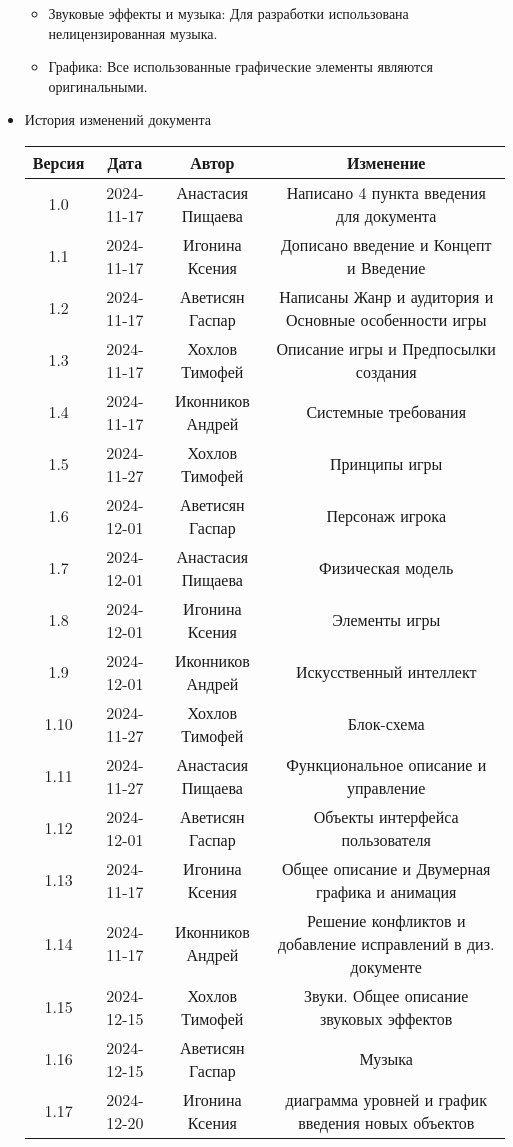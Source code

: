 \documentclass{article}
\begin{document}
\begin{itemize}
\begin{itemize}
\item Звуковые эффекты и музыка: Для разработки использована нелицензированная музыка.

\item Графика: Все использованные графические элементы являются оригинальными.
\end{itemize}

\item История изменений документа
\begin{center}
\begin{tabular}{| c | c | c | c |}
\hline
 Версия & Дата & Автор & Изменение \\  \hline
 1.0 & 2024-11-17 & Анастасия Пищаева & Написано 4 пункта введения для документа\\ \hline
 1.1 & 2024-11-17 & Игонина Ксения & Дописано введение и Концепт и Введение\\  \hline 
 1.2 & 2024-11-17 & Аветисян Гаспар & Написаны Жанр и аудитория и Основные особенности игры\\  \hline
 1.3 & 2024-11-17 & Хохлов Тимофей & Описание игры и Предпосылки создания\\  \hline
 1.4 & 2024-11-17 & Иконников Андрей & Системные требования\\ \hline 
 1.5 & 2024-11-27 & Хохлов Тимофей & Принципы игры\\  \hline
 1.6 & 2024-12-01 & Аветисян Гаспар & Персонаж игрока\\ \hline
 1.7 & 2024-12-01 & Анастасия Пищаева & Физическая модель\\ \hline
 1.8 & 2024-12-01 & Игонина Ксения & Элементы игры\\ \hline
 1.9 & 2024-12-01 & Иконников Андрей & Искусственный интеллект\\ \hline
 1.10 & 2024-11-27 & Хохлов Тимофей & Блок-схема\\  \hline
 1.11 & 2024-11-27 & Анастасия Пищаева & Функциональное описание и управление\\  \hline
 1.12 & 2024-12-01 & Аветисян Гаспар & Объекты интерфейса пользователя\\ \hline
 1.13 & 2024-11-17 & Игонина Ксения & Общее описание и Двумерная графика и анимация\\  \hline
 1.14 & 2024-11-17 & Иконников Андрей & Решение конфликтов и добавление исправлений в диз. документе\\  \hline
 1.15 & 2024-12-15 & Хохлов Тимофей & Звуки. Общее описание звуковых эффектов\\  \hline
 1.16 & 2024-12-15 & Аветисян Гаспар & Музыка\\
 1.17 & 2024-12-20 & Игонина Ксения & диаграмма уровней и график введения новых объектов\\ \hline



\end{tabular}
\end{center}
\end{itemize}
\end{document}
